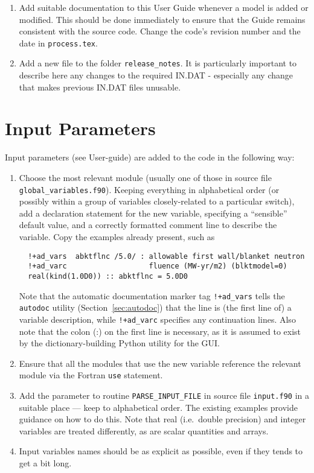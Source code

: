 \documentclass[11pt,a4paper]{report}
\begin{document}
\begin{enumerate}
\item Add suitable documentation to this User Guide whenever a
  model is added or modified. This should be done immediately to ensure that
  the Guide remains consistent with the source code. Change the code's revision
  number and the date in \texttt{process.tex}.

\item Add a new file to the folder \texttt{release\_notes}.  It is particularly important to describe here any changes to the required IN.DAT - especially any change that makes previous IN.DAT files unusable.

\end{enumerate}

\section{Input Parameters}

Input parameters (see User-guide) are added to the code in the
following way:

\begin{enumerate}

\item Choose the most relevant module (usually one of those in source file
  \texttt{global\_variables.f90}). Keeping everything in alphabetical order
  (or possibly within a group of variables closely-related to a particular
  switch), add a declaration statement for the new variable, specifying a
  ``sensible'' default value, and a correctly formatted comment line to
  describe the variable. Copy the examples already present, such as
\begin{verbatim}
  !+ad_vars  abktflnc /5.0/ : allowable first wall/blanket neutron
  !+ad_varc                   fluence (MW-yr/m2) (blktmodel=0)
  real(kind(1.0D0)) :: abktflnc = 5.0D0
\end{verbatim}
  Note that the automatic documentation marker tag \verb.!+ad_vars. tells the
  \texttt{autodoc} utility (Section~\ref{sec:autodoc}) that the line is (the
  first line of) a variable description, while \verb.!+ad_varc. specifies any
  continuation lines. Also note that the colon (:) on the first line is
  necessary, as it is assumed to exist by the dictionary-building Python
  utility for the GUI\@.


\item Ensure that all the modules that use the new variable reference the
  relevant module via the Fortran \texttt{use} statement.

\item Add the parameter to routine \texttt{PARSE\_INPUT\_FILE} in source file
  \texttt{input.f90} in a suitable place --- keep to alphabetical order. The
  existing examples provide guidance on how to do this. Note that real (i.e.\
  double precision) and integer variables are treated differently, as are
  scalar quantities and arrays.

\item Input variables names should be as explicit as possible, even if they 
	tends to get a bit long.

\end{enumerate}
\end{document}
